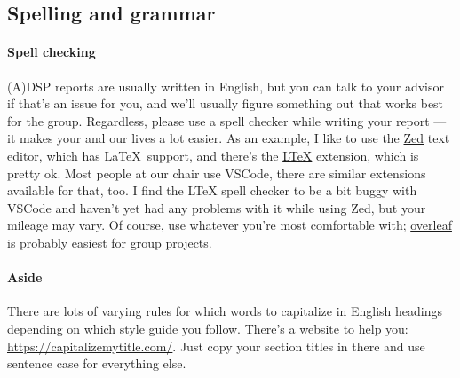 \documentclass{3s-report}
\begin{document}
    \subsection{Spelling and grammar}

    \paragraph{Spell checking}
    (A)DSP reports are usually written in English, but you can talk to your advisor if that's an issue for you, and we'll usually figure something out that works best for the group.
    Regardless, please use a spell checker while writing your report --- it makes your and our lives a lot easier.
    As an example, I like to use the \href{https://zed.dev}{Zed} text editor, which has \LaTeX\ support, and there's the \href{https://zed.dev/extensions/ltex}{LTeX} extension, which is pretty ok.
    Most people at our chair use VSCode, there are similar extensions available for that, too.
    I find the LTeX spell checker to be a bit buggy with VSCode and haven't yet had any problems with it while using Zed, but your mileage may vary.
    Of course, use whatever you're most comfortable with; \href{https://www.overleaf.com/}{overleaf} is probably easiest for group projects.

    \paragraph{Aside}
    There are lots of varying rules for which words to capitalize in English headings depending on which style guide you follow.
    There's a website to help you: \url{https://capitalizemytitle.com/}.
    Just copy your section titles in there and use sentence case for everything else.
\end{document}
